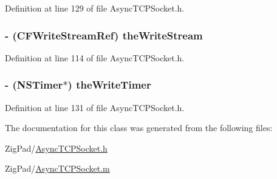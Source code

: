 Definition at line 129 of file AsyncTCPSocket.h.

\hypertarget{interface_async_t_c_p_socket_aec37f271ac2a31efa3a76b450c550002}{
\subsubsection[{theWriteStream}]{\setlength{\rightskip}{0pt plus 5cm}-\/ (CFWriteStreamRef) {\bf theWriteStream}}}
\label{interface_async_t_c_p_socket_aec37f271ac2a31efa3a76b450c550002}


Definition at line 114 of file AsyncTCPSocket.h.

\hypertarget{interface_async_t_c_p_socket_ac1a3ea539394e9e5650e17b76623b0a8}{
\subsubsection[{theWriteTimer}]{\setlength{\rightskip}{0pt plus 5cm}-\/ (NSTimer$\ast$) {\bf theWriteTimer}}}
\label{interface_async_t_c_p_socket_ac1a3ea539394e9e5650e17b76623b0a8}


Definition at line 131 of file AsyncTCPSocket.h.



The documentation for this class was generated from the following files:\begin{DoxyCompactItemize}
\item 
ZigPad/\hyperlink{_async_t_c_p_socket_8h}{AsyncTCPSocket.h}\item 
ZigPad/\hyperlink{_async_t_c_p_socket_8m}{AsyncTCPSocket.m}\end{DoxyCompactItemize}
